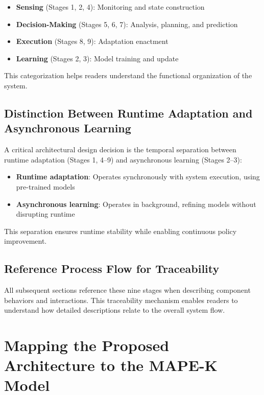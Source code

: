\documentclass[11pt,a4paper]{article}
\begin{document}
\begin{itemize}
    \item \textbf{Sensing} (Stages 1, 2, 4): Monitoring and state construction
    \item \textbf{Decision-Making} (Stages 5, 6, 7): Analysis, planning, and prediction
    \item \textbf{Execution} (Stages 8, 9): Adaptation enactment
    \item \textbf{Learning} (Stages 2, 3): Model training and update
\end{itemize}

This categorization helps readers understand the functional organization of the system.

\subsection{Distinction Between Runtime Adaptation and Asynchronous Learning}

A critical architectural design decision is the temporal separation between runtime adaptation (Stages 1, 4--9) and asynchronous learning (Stages 2--3):

\begin{itemize}
    \item \textbf{Runtime adaptation}: Operates synchronously with system execution, using pre-trained models
    \item \textbf{Asynchronous learning}: Operates in background, refining models without disrupting runtime
\end{itemize}

This separation ensures runtime stability while enabling continuous policy improvement.

\subsection{Reference Process Flow for Traceability}

All subsequent sections reference these nine stages when describing component behaviors and interactions. This traceability mechanism enables readers to understand how detailed descriptions relate to the overall system flow.


\section{Mapping the Proposed Architecture to the MAPE-K Model}
\label{sec:mape-k-mapping}
\end{document}
